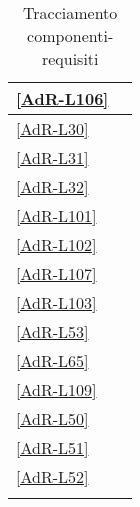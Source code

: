 \begin{longtable}{|P{6cm}|P{6cm}|}
	\hline \ref{AdR-L106} &  \\
	\hline \ref{AdR-L30} &  \\
	\hline \ref{AdR-L31} &  \\
	\hline \ref{AdR-L32} &  \\
	\hline \ref{AdR-L101} &  \\ %
	\hline \ref{AdR-L102} &  \\
	\hline \ref{AdR-L107} &  \\
	\hline \ref{AdR-L103} &  \\
	\hline \ref{AdR-L53} &  \\
	\hline \ref{AdR-L65} &  \\ %
	\hline \ref{AdR-L109} &  \\
	\hline \ref{AdR-L50} &  \\
	\hline \ref{AdR-L51} &  \\
	\hline \ref{AdR-L52} &  \\ %
	
	\hline
	\caption{Tracciamento componenti-requisiti}
\end{longtable}

